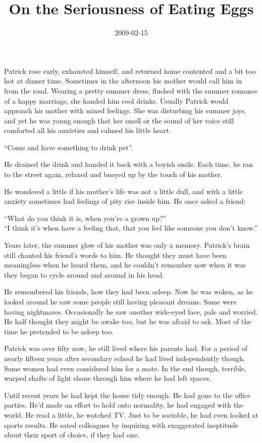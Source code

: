 \documentclass[11pt]{article}
\title{On the Seriousness of Eating Eggs}
\date{2009-02-15}
\begin{document}
Patrick rose early, exhausted himself, and returned home contented and a bit too hot at dinner time. Sometimes in the afternoon his mother would call him in from the road. Wearing a pretty summer dress, flushed with the summer romance of a happy marriage, she handed him cool drinks. Usually Patrick would approach his mother with mixed feelings. She was disturbing his summer joys, and yet he was young enough that her smell or the sound of her voice still comforted all his anxieties and calmed his little heart.

``Come and have something to drink pet''.

He drained the drink and handed it back with a boyish smile. Each time, he ran to the street again, relaxed and buoyed up by the touch of his mother.

He wondered a little if his mother's life was not a little dull, and with a little anxiety sometimes had feelings of pity rise inside him. He once asked a friend:

``What do you think it is, when you're a grown up?''\\ ``I think it's when have a feeling that, that you feel like someone you don't know.''

Years later, the summer glow of his mother was only a memory. Patrick's brain still chanted his friend's words to him. He thought they must have been meaningless when he heard them, and he couldn't remember now when it was they began to cycle around and around in his head.

He remembered his friends, how they had been asleep. Now he was woken, as he looked around he saw some people still having pleasant dreams. Some were having nightmares. Occasionally he saw another wide-eyed face, pale and worried. He half thought they might be awake too, but he was afraid to ask. Most of the time he pretended to be asleep too.

Patrick was over fifty now, he still lived where his parents had. For a period of nearly fifteen years after secondary school he had lived independently though. Some women had even considered him for a mate. In the end though, terrible, warped shafts of light shone through him where he had left spaces.

Until recent years he had kept the house tidy enough. He had gone to the office parties. He'd made an effort to hold onto normality, he had engaged with the world. He read a little, he watched TV. Just to be sociable, he had even looked at sports results. He sated colleagues by inquiring with exaggerated ineptitude about their sport of choice, if they had one.
\end{document}
